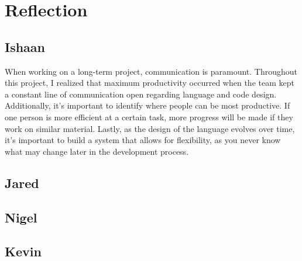 \chapter{Reflection}

\section{Ishaan}
When working on a long-term project, communication is paramount. Throughout this project, I realized that maximum productivity occurred when the team kept a constant line of communication open regarding language and code design.
Additionally, it's important to identify where people can be most productive. If one person is more efficient at a certain task, more progress will be made if they work on similar material.
Lastly, as the design of the language evolves over time, it's important to build a system that allows for flexibility, as you never know what may change later in the development process.

\section{Jared}

\section{Nigel}

\section{Kevin}
